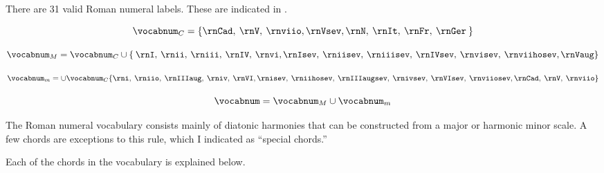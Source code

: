 
There are 31 valid Roman numeral labels. These are indicated
in .



\begin{equation}
    \vocabnum_{C} = \{ \rnCad, \: \rnV, \: \rnviio,
                \rnVsev, \rnN, \: \rnIt, \: \rnFr, \: \rnGer \: \}
\end{equation}

\begin{equation}
    \vocabnum_{M} = \vocabnum_{C} \cup \{ \: \rnI, \: \rnii, \: \rniii, \: \rnIV, \: \rnvi,
                \rnIsev, \: \rniisev, \: \rniiisev, \: \rnIVsev, \: 
                \rnvisev, \: \rnviihosev, \rnVaug \}
\end{equation}


\begin{equation}
    \vocabnum_{m} = \cup \vocabnum_{C} \{ \rni, \: \rniio, \: \rnIIIaug, \: \rniv, \: \rnVI,
                \rnisev, \: \rniihosev, \: \rnIIIaugsev, \: \rnivsev, \: \rnVIsev, \: \rnviiosev,
                \rnCad, \: \rnV, \: \rnviio \}
\end{equation}

\begin{equation}
    \vocabnum = \vocabnum_{M} \cup \vocabnum_{m}
\end{equation}

                

The Roman numeral vocabulary consists mainly of diatonic
harmonies that can be constructed from a major or harmonic
minor scale. A few chords are exceptions to this rule, \:
which I indicated as ``special chords.''

Each of the chords in the vocabulary is explained below.


